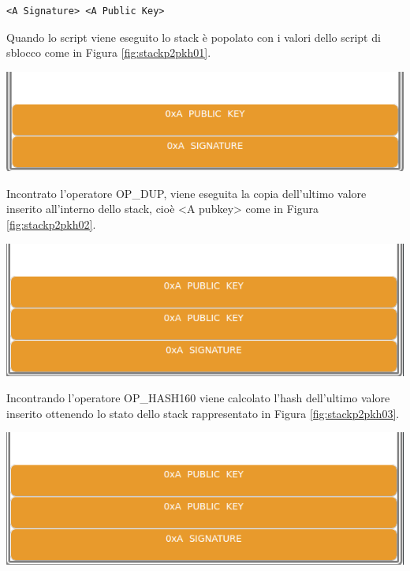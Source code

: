 \begin{lstlisting}[language=bitcoinscript, caption={P2PKH Script di sblocco.}]
<A Signature> <A Public Key>
\end{lstlisting}



Quando lo script viene eseguito lo stack è popolato con i valori dello script di sblocco come in Figura \ref{fig:stackp2pkh01}.

{\centering
\vspace{15pt}
\includegraphics[scale=0.35]{images/script/p2pkh/1.png}
\vspace{10pt}
\par}


Incontrato l’operatore OP\_DUP, viene eseguita la copia dell’ultimo valore inserito all’interno dello stack, cioè <A pubkey> come in Figura \ref{fig:stackp2pkh02}.

{\centering
\vspace{15pt}
\includegraphics[scale=0.35]{images/script/p2pkh/2.png}
\vspace{10pt}
\par}

Incontrando l’operatore OP\_HASH160 viene calcolato l’hash dell’ultimo valore inserito ottenendo lo stato dello stack rappresentato in Figura \ref{fig:stackp2pkh03}.

{\centering
\vspace{15pt}
\includegraphics[scale=0.35]{images/script/p2pkh/2.png}
\vspace{10pt}
\par}

